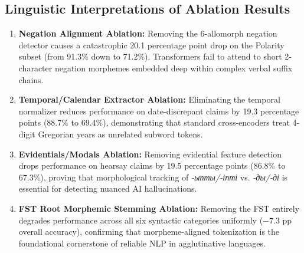 \subsection{Linguistic Interpretations of Ablation Results}
\begin{enumerate}
    \item \textbf{Negation Alignment Ablation:} Removing the 6-allomorph negation detector causes a catastrophic 20.1 percentage point drop on the Polarity subset (from 91.3\% down to 71.2\%). Transformers fail to attend to short 2-character negation morphemes embedded deep within complex verbal suffix chains.
    \item \textbf{Temporal/Calendar Extractor Ablation:} Eliminating the temporal normalizer reduces performance on date-discrepant claims by 19.3 percentage points (88.7\% to 69.4\%), demonstrating that standard cross-encoders treat 4-digit Gregorian years as unrelated subword tokens.
    \item \textbf{Evidentials/Modals Ablation:} Removing evidential feature detection drops performance on hearsay claims by 19.5 percentage points (86.8\% to 67.3\%), proving that morphological tracking of \textit{-ыпты/-іпті} vs. \textit{-ды/-ді} is essential for detecting nuanced AI hallucinations.
    \item \textbf{FST Root Morphemic Stemming Ablation:} Removing the FST entirely degrades performance across all six syntactic categories uniformly ($-7.3$ pp overall accuracy), confirming that morpheme-aligned tokenization is the foundational cornerstone of reliable NLP in agglutinative languages.
\end{enumerate}
